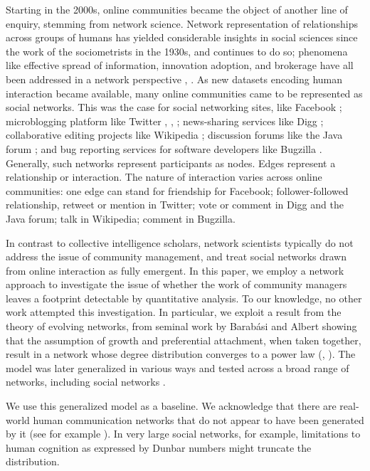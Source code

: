 \documentclass{bmcart}
\begin{document}
Starting in the 2000s, online communities became the object of another line of enquiry, stemming from network science. Network representation of relationships across groups of humans has yielded considerable insights in social sciences since the work of the sociometrists in the 1930s, and continues to do so; phenomena like effective spread of information, innovation adoption, and brokerage have all been addressed in a network perspective \cite{borgatti2009network}, \cite{burt2009structural}. As new datasets encoding human interaction became available, many online communities came to be represented as social networks. This was the case for social networking sites, like Facebook \cite{lewis2008tastes} \cite{nick2013toward}; microblogging platform like Twitter \cite{kunegis2013preferential}, \cite{java2007we}, \cite{hodas2014simple}; news-sharing services like Digg \cite{hodas2014simple}; collaborative editing projects like Wikipedia \cite{laniado2011wikipedians}; discussion forums like the Java forum \cite{zhang2007expertise}; and bug reporting services for software developers like Bugzilla \cite{zanetti2012quantitative}. Generally, such networks represent participants as nodes. Edges represent a relationship or interaction. The nature of interaction varies across online communities: one edge can stand for friendship for Facebook; follower-followed relationship, retweet or mention in Twitter; vote or comment in Digg and the Java forum; talk in Wikipedia; comment in Bugzilla. 

In contrast to collective intelligence scholars, network scientists typically do not address the issue of community management, and treat social networks drawn from online interaction as fully emergent. In this paper, we employ a network approach to investigate the issue of whether the work of community managers leaves a footprint detectable by quantitative analysis. To our knowledge, no other work attempted this investigation.
In particular, we exploit a result from the theory of evolving networks, from seminal work by Barab\'asi and Albert \cite{barabasi1999emergence} showing that the assumption of growth and preferential attachment, when taken together, result in a network whose degree distribution converges to a power law (\cite{barabasi2005origin}, \cite{barabasi1999mean}). The model was later generalized in various ways and tested across a broad range of networks, including social networks 
\cite{dorogovtsev2002evolution}. 

We use this generalized model as a baseline. We acknowledge that there are real-world human communication networks that do not appear to have been generated by it (see for example \cite{leskovec2008planetary}). In very large social networks, for example, limitations to human cognition as expressed by Dunbar numbers might truncate the distribution. 
\end{document}
